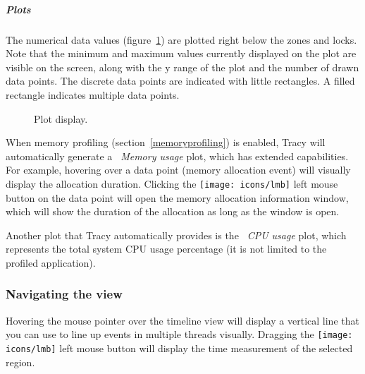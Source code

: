 \documentclass[hidelinks,titlepage,a4paper,twoside]{article}
\newcommand{\LMB}{\texttt{[image: icons/lmb]}}
\begin{document}
\subparagraph{Plots}
\label{plots}

The numerical data values (figure~\ref{plot}) are plotted right below the zones and locks. Note that the minimum and maximum values currently displayed on the plot are visible on the screen, along with the y range of the plot and the number of drawn data points. The discrete data points are indicated with little rectangles. A filled rectangle indicates multiple data points.

\begin{figure}[h]
\centering{}
\caption{Plot display.}
\label{plot}
\end{figure}

When memory profiling (section~\ref{memoryprofiling}) is enabled, Tracy will automatically generate a \emph{\faMemory{}~Memory usage} plot, which has extended capabilities. For example, hovering over a data point (memory allocation event) will visually display the allocation duration. Clicking the \LMB{} left mouse button on the data point will open the memory allocation information window, which will show the duration of the allocation as long as the window is open.

Another plot that Tracy automatically provides is the \emph{\faTachometer*{}~CPU usage} plot, which represents the total system CPU usage percentage (it is not limited to the profiled application).

\subsubsection{Navigating the view}

Hovering the \faMousePointer{} mouse pointer over the timeline view will display a vertical line that you can use to line up events in multiple threads visually. Dragging the \LMB{} left mouse button will display the time measurement of the selected region.
\end{document}
